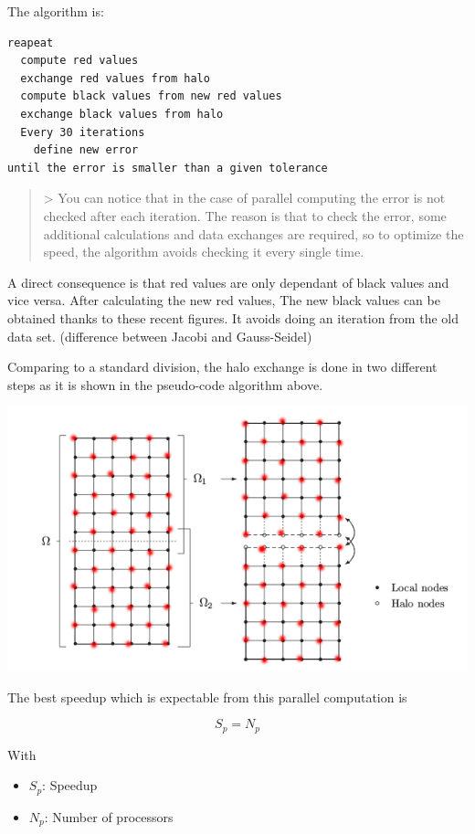 \documentclass[a4paper,11pt]{article}
\begin{document}
The algorithm is:

\begin{verbatim}
reapeat 
  compute red values
  exchange red values from halo
  compute black values from new red values
  exchange black values from halo
  Every 30 iterations
    define new error
until the error is smaller than a given tolerance
\end{verbatim}

\begin{quote}
> You can notice that in the case of parallel computing the error is not checked after each
iteration. The reason is that to check the error, some additional calculations and
data exchanges are required, so to optimize the speed, the algorithm avoids checking it every single time.
\end{quote}

A direct consequence is that red values are only dependant of black values and vice versa. After
calculating the new red values, The new black values can be obtained thanks to these recent figures.
It avoids doing an iteration from the old data set. (difference between Jacobi and Gauss-Seidel)

Comparing to a standard division, the halo exchange is done in two different steps as it is shown in the
pseudo-code algorithm above.

\includegraphics[width=\textwidth]{images/redblack.png}

The best speedup which is expectable from this parallel computation is

$$S_p = N_p$$

With
\begin{itemize}
  \item{$S_p$: Speedup}
  \item{$N_p$: Number of processors}
\end{itemize}
\end{document}
